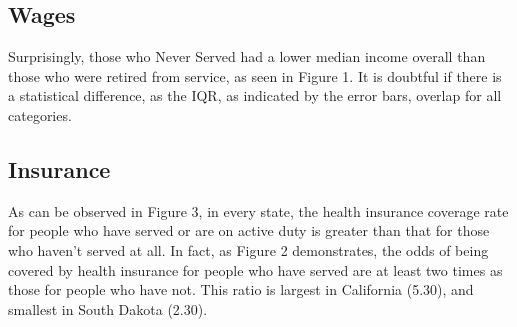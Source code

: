 \documentclass{article}
\begin{document}
\subsection{Wages}
Surprisingly, those who Never Served had a lower median income overall than those who were retired from service, as seen in Figure 1. It is doubtful if there is a statistical difference, as the IQR, as indicated by the error bars, overlap for all categories. 


\begin{figure}[ht!]
\begin{floatrow}
\end{floatrow}

\end{figure}


\pagebreak


\subsection{Insurance}
As can be observed in Figure 3, in every state, the health insurance coverage rate for people who have served or are on active duty is greater than that for those who haven't served at all. In fact, as Figure 2 demonstrates, the odds of being covered by health insurance for people who have served are at least two times as those for people who have not. This ratio is largest in California (5.30), and smallest in South Dakota (2.30).
\end{document}
